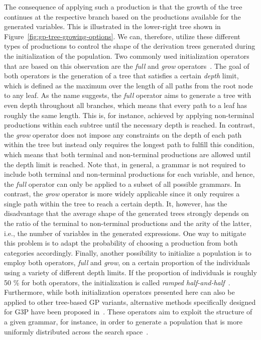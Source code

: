 The consequence of applying such a production is that the growth of the tree continues at the respective branch based on the productions available for the generated variables.
This is illustrated in the lower-right tree shown in Figure~\ref{fig:gp-tree-growing-options}. 
We can, therefore, utilize these different types of productions to control the shape of the derivation trees generated during the initialization of the population.
Two commonly used initialization operators that are based on this observation are the \emph{full} and \emph{grow} operators~\cite{poli2008field}.  
The goal of both operators is the generation of a tree that satisfies a certain \emph{depth} limit, which is defined as the maximum over the length of all paths from the root node to any leaf.
As the name suggests, the \emph{full} operator aims to generate a tree with even depth throughout all branches, which means that every path to a leaf has roughly the same length.
This is, for instance, achieved by applying non-terminal productions within each subtree until the necessary depth is reached.
In contrast, the \emph{grow} operator does not impose any constraints on the depth of each path within the tree but instead only requires the longest path to fulfill this condition, which means that both terminal and non-terminal productions are allowed until the depth limit is reached.
Note that, in general, a grammar is not required to include both terminal and non-terminal productions for each variable, and hence, the \emph{full} operator can only be applied to a subset of all possible grammars.
In contrast, the \emph{grow} operator is more widely applicable since it only requires a single path within the tree to reach a certain depth. 
It, however, has the disadvantage that the average shape of the generated trees strongly depends on the ratio of the terminal to non-terminal productions and the arity of the latter, i.e., the number of variables in the generated expressions.
One way to mitigate this problem is to adapt the probability of choosing a production from both categories accordingly.
Finally, another possibility to initialize a population is to employ both operators, \emph{full} and \emph{grow}, on a certain proportion of the individuals using a variety of different depth limits. 
If the proportion of individuals is roughly 50 \% for both operators, the initialization is called \emph{ramped half-and-half}~\cite{poli2008field,koza1994genetic}.
Furthermore, while both initialization operators presented here can also be applied to other tree-based GP variants, alternative methods specifically designed for G3P have been proposed in~\cite{garcia2006initialization,criado2020grammatically}.
These operators aim to exploit the structure of a given grammar, for instance, in order to generate a population that is more uniformly distributed across the search space~\cite{criado2020grammatically}.

